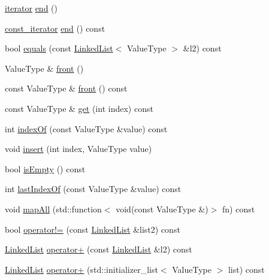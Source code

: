 \begin{DoxyCompactItemize}
\item 
\mbox{\hyperlink{classLinkedList_a50754c96f45bbb0f50e145fd70de6615}{iterator}} \mbox{\hyperlink{classLinkedList_acad38d52497a975bfb6f2f6acd76631f}{end}} ()
\item 
\mbox{\hyperlink{classLinkedList_a3b9d37bc4aeea14213d403a3b30a230f}{const\+\_\+iterator}} \mbox{\hyperlink{classLinkedList_accf9a4bd0c34d4a5f6a7dab66ea10cdc}{end}} () const
\item 
bool \mbox{\hyperlink{classLinkedList_a0e2f3f8756f745a9243a086687c414f4}{equals}} (const \mbox{\hyperlink{classLinkedList}{Linked\+List}}$<$ Value\+Type $>$ \&l2) const
\item 
Value\+Type \& \mbox{\hyperlink{classLinkedList_a736a6bda35a26620407e175bee46ae4a}{front}} ()
\item 
const Value\+Type \& \mbox{\hyperlink{classLinkedList_a02aaa52ad7a120201f6dd3e90eff737f}{front}} () const
\item 
const Value\+Type \& \mbox{\hyperlink{classLinkedList_adcb38df411d14f0bd9c14e23947d2e1c}{get}} (int index) const
\item 
int \mbox{\hyperlink{classLinkedList_a619aacfb96804495d3182a7131cf3539}{index\+Of}} (const Value\+Type \&value) const
\item 
void \mbox{\hyperlink{classLinkedList_a01bce249d8a64cd8cb43e7d46cb7b464}{insert}} (int index, Value\+Type value)
\item 
bool \mbox{\hyperlink{classLinkedList_acf82f9b2937375c7b1cf3dccb3df3312}{is\+Empty}} () const
\item 
int \mbox{\hyperlink{classLinkedList_a48d608a1714954f0a7bcac6459483cb6}{last\+Index\+Of}} (const Value\+Type \&value) const
\item 
void \mbox{\hyperlink{classLinkedList_a0661241902bd7df69ab9c56f8d4c93c9}{map\+All}} (std\+::function$<$ void(const Value\+Type \&)$>$ fn) const
\item 
bool \mbox{\hyperlink{classLinkedList_ae6756397a80197200f1c3fe3bf7dc59f}{operator!=}} (const \mbox{\hyperlink{classLinkedList}{Linked\+List}} \&list2) const
\item 
\mbox{\hyperlink{classLinkedList}{Linked\+List}} \mbox{\hyperlink{classLinkedList_a481f0eabff2912b261b522aaf561b067}{operator+}} (const \mbox{\hyperlink{classLinkedList}{Linked\+List}} \&l2) const
\item 
\mbox{\hyperlink{classLinkedList}{Linked\+List}} \mbox{\hyperlink{classLinkedList_a722fa9320d5ad78caeda370f755ddc7d}{operator+}} (std\+::initializer\+\_\+list$<$ Value\+Type $>$ list) const

\end{DoxyCompactItemize}
